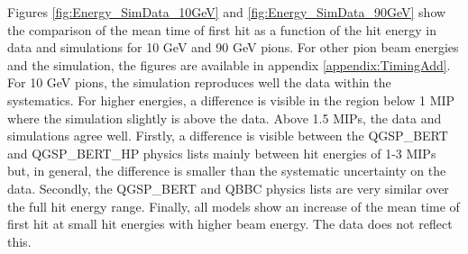 Figures \ref{fig:Energy_SimData_10GeV} and \ref{fig:Energy_SimData_90GeV} show the comparison of the mean time of first hit as a function of the hit energy in data and simulations for 10 GeV and 90 GeV pions. For other pion beam energies and the \ddhep simulation, the figures are available in appendix \ref{appendix:TimingAdd}. For 10 GeV pions, the simulation reproduces well the data within the systematics. For higher energies, a difference is visible in the region below 1 MIP where the simulation slightly is above the data. Above 1.5 MIPs, the data and simulations agree well. Firstly, a difference is visible between the QGSP\_BERT and QGSP\_BERT\_HP physics lists mainly between hit energies of 1-3 MIPs but, in general, the difference is smaller than the systematic uncertainty on the data. Secondly, the QGSP\_BERT and QBBC physics lists are very similar over the full hit energy range. Finally, all models show an increase of the mean time of first hit at small hit energies with higher beam energy. The data does not reflect this.

